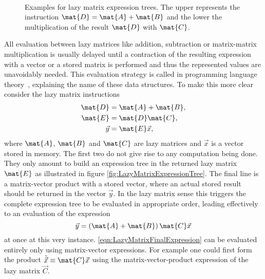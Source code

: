 \begin{figure}
	\centering
	 \\[0.8em]
	\caption[Examples for lazy matrix expression trees]
	{
		Examples for lazy matrix expression trees.
		The upper represents the instruction
		$\mat{D} = \mat{A} + \mat{B}$
		and the lower the multiplication of the result $\mat{D}$
		with $\mat{C}$.
	}
	\label{fig:LazyMatrixExpressionTree}
\end{figure}
All evaluation between lazy matrices
like addition, subtraction or matrix-matrix multiplication
is usually delayed until a contraction of the resulting
expression with a vector or a stored matrix is performed
and thus the represented values are unavoidably needed.
This evaluation strategy is called 
in programming language theory~, explaining the name of these data structures.
To make this more clear consider the lazy matrix instructions
\begin{equation}
	\begin{aligned}
		\label{eqn:LazyMatrixInstructions}
		\mat{D} &= \mat{A} + \mat{B}, \\
		\mat{E} &= \mat{D} \mat{C}, \\
		\vec{y} &= \mat{E} \vec{x},
	\end{aligned}
\end{equation}
where $\mat{A}$, $\mat{B}$ and $\mat{C}$ are lazy matrices
and $\vec{x}$ is a vector stored in memory.
The first two do not give rise to any computation being done.
They only amount to build an expression tree in the returned
lazy matrix $\mat{E}$ as illustrated in figure \vref{fig:LazyMatrixExpressionTree}.
The final line is a matrix-vector product with a stored vector,
where an actual stored result should be returned in the vector $\vec{y}$.
In the lazy matrix sense this triggers the complete expression tree to be
evaluated in appropriate order,
leading effectively to an evaluation of the expression
\begin{equation}
	\vec{y} = \left( \mat{A} + \mat{B} \right) \mat{C} \vec{x}
	\label{eqn:LazyMatrixFinalExpression}
\end{equation}
at once at this very instance.
\eqref{eqn:LazyMatrixFinalExpression} can be evaluated entirely only using
matrix-vector \contraction expressions.
For example one could first form the product $\tilde{\vec{x}} \equiv \mat{C} \vec{x}$
using the  matrix-vector-product expression of the lazy matrix $\vec{C}$.
